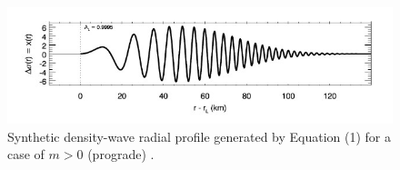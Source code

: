 \documentclass{article}
\begin{document}
\begin{figure}[h] 
\centering 
\includegraphics[width=1.0\textwidth]{Linear_Density_WM.jpg}
\caption{Synthetic density-wave radial profile generated by Equation (1) for a case of $m>0$ (prograde) \cite{Tiscareno_2007}.} \label{fig:my_label}
\end{figure}







\end{document}

